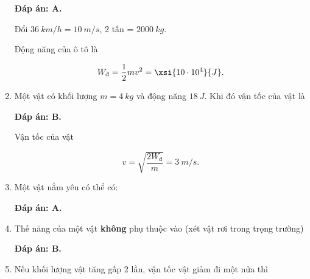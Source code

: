 \begin{enumerate}[label=\bfseries Câu \arabic*:, leftmargin=1.5cm]
	\hideall
	{	
		\textbf{Đáp án: A.}
		
		Đổi $\SI{36}{km/h} = \SI{10}{m/s}$, 2 tấn = $\SI{2000}{kg}.$
		
		Động năng của ô tô là
		
		$$W_\text{đ} = \dfrac{1}{2}mv^2 = \xsi{10\cdot 10^4}{J}.$$
	}
	\item {}
	
	
	{Một vật có khối lượng $m = \SI{4}{kg}$ và động năng $\SI{18}{J}$. Khi đó vận tốc của vật là
	}
	
	\hideall
	{	
		\textbf{Đáp án: B.}
		
		Vận tốc của vật
		
		$$ v = \sqrt{\dfrac{2W_\text{đ}}{m}} = \SI{3}{m/s}.$$ 
	}
	\item {}
	
	
	{Một vật nằm yên có thể có:
	}
	
	\hideall
	{	
		\textbf{Đáp án: A.}
	}
	\item {}
	
	
	{Thế năng của một vật \textbf{không} phụ thuộc vào (xét vật rơi trong trọng trường)
	}
	
	\hideall
	{	
		\textbf{Đáp án: B.}
	}
	\item {}
	
	
	{Nếu khối lượng vật tăng gấp 2 lần, vận tốc vật giảm đi một nửa thì
	}
	

\end{enumerate}
